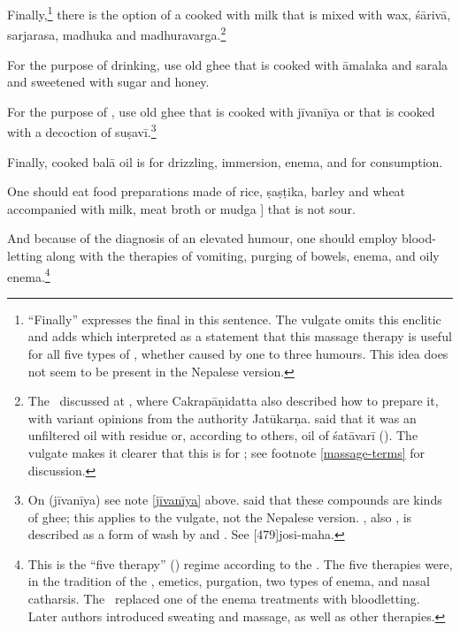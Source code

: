 \begin{translation}
Finally,\footnote{“Finally” expresses the final  in this
    sentence.  The vulgate omits this enclitic and adds 
    which  interpreted as a statement that this
    massage therapy is useful for all five types of , whether caused by one to three humours.
    This idea does not seem to be present in the Nepalese version.}  there
    is the option of a  cooked with milk that
    is mixed with wax, \gls{śārivā},
    \gls{sarjarasa}, \gls{madhuka} and \gls{madhuravarga}.\footnote{The
        \CS\ discussed  at , where
        Cakrapāṇidatta also described how to prepare it, with variant opinions
        from the authority Jatūkarṇa.  said that it was
        an unfiltered oil with residue or, according to others, oil of
        \gls{śatāvarī} (). The vulgate makes it clearer that
        this is for ; see footnote
        \ref{massage-terms} for discussion.}

For the purpose of drinking, use old ghee that is cooked with
\gls{āmalaka} and \gls{sarala} and sweetened with sugar and honey.

For the purpose of , use old ghee that is cooked with
\gls{jīvanīya} or that is cooked with a decoction of
\gls{suṣavī}.\footnote{On  (\gls{jīvanīya}) see note
    \ref{jīvanīya} above.  said that these compounds
    are kinds of ghee; this applies to the vulgate, not the Nepalese
    version.  , also , is described as a form of wash by  and .  See [479]{josi-maha}.}
    
            
Finally, cooked \gls{balā} oil is for drizzling, immersion, enema, and for
consumption.     
    
One should eat food preparations made of rice, \gls{ṣaṣṭika}, barley
and wheat accompanied with milk, meat broth or \gls{mudga} ] that
is not sour.   

And because of the diagnosis of an elevated humour, one should employ
blood-letting along with the therapies of vomiting, purging of bowels,
enema, and oily enema.\footnote{This is the “five therapy”
    () regime according to the \SS.  The five therapies
    were, in the tradition of the \CS, emetics, purgation, two types of
    enema, and nasal catharsis. The \SS\ replaced one of the enema
    treatments with bloodletting. Later authors introduced sweating and
    massage, as well as other therapies.
    
}
\end{translation}

